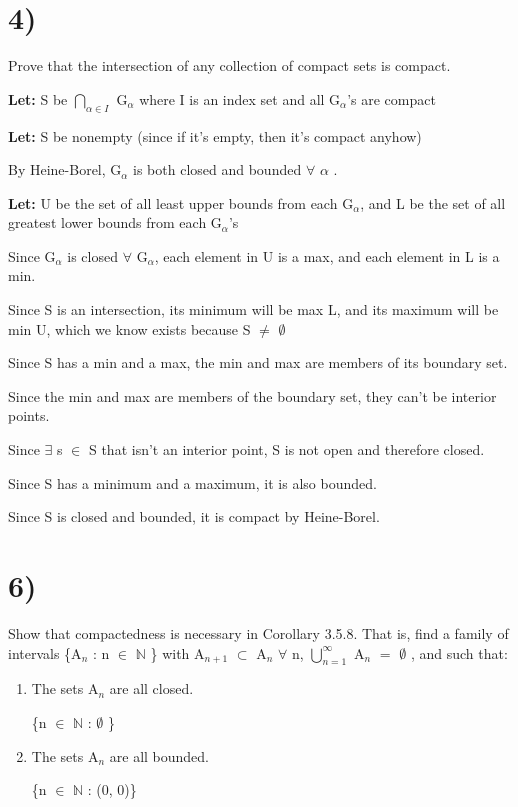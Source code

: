 \documentclass{article}
\newcommand{\mt}[1]{\ensuremath{#1}}
\newcommand\bsc[2][\DefaultOpt]{%
  \def\DefaultOpt{#2}%
  \section[#1]{#2}%
}
\newcommand{\balist}{\begin{enumerate}[label=\alph*.]}
\newcommand{\elist}{\end{enumerate}}
\newcommand{\lt}[1]{\textbf{Let: } #1}
\newcommand{\bn}{\mt{\mathbb{N}} }       %
\newcommand{\fa}{\mt{\forall} }          %
\newcommand{\afa}{\mt{\alpha} }
\newcommand{\mem}{\mt{\in} }
\newcommand{\exs}{\mt{\exists} }
\newcommand{\es}{\mt{\emptyset} }        %
\newcommand{\sbs}{\mt{\subset} }         %
\newcommand{\eql}{\mt{=} }
\newcommand{\uw}[2]{#1\mt{_{#2}}}
\newcommand{\urng}[2]{\mt{\bigcup_{#1}^{#2}}}
\newcommand{\nrng}[2]{\mt{\bigcap_{#1}^{#2}}}
\begin{document}
\bsc{4)}{
Prove that the intersection of any collection of compact sets is compact.

\lt{S be \nrng{\afa \mem I}{} \uw{G}{\afa} where I is an index set and all \uw{G}{\afa}'s are compact}

\lt{S be nonempty (since if it's empty, then it's compact anyhow)}


By Heine-Borel, \uw{G}{\afa} is both closed and bounded \fa \afa.

\lt{U be the set of all least upper bounds from each \uw{G}{\afa}, and L be the set of all greatest lower bounds from each \uw{G}{\afa}'s}

Since \uw{G}{\afa} is closed \fa \uw{G}{\afa}, each element in U is a max, and each element in L is a min.

Since S is an intersection, its minimum will be max L, and its maximum will be min U, which we know exists because S $\neq$ \es

Since S has a min and a max, the min and max are members of its boundary set.

Since the min and max are members of the boundary set, they can't be interior points.

Since \exs s \mem S that isn't an interior point, S is not open and therefore closed.

Since S has a minimum and a maximum, it is also bounded.

Since S is closed and bounded, it is compact by Heine-Borel.
}

\bsc{6)}{
Show that compactedness is necessary in Corollary 3.5.8. That is, find a family of intervals \{\uw{A}{n} : n \mem \bn\} with \uw{A}{n + 1} \sbs \uw{A}{n} \fa n, \urng{n = 1}{\infty} \uw{A}{n} \eql \es, and such that:

\balist
\item The sets \uw{A}{n} are all closed. 
	
	\{n \mem \bn : \es\}
\item The sets \uw{A}{n} are all bounded.
	
	\{n \mem \bn : (0, 0)\}
\elist

}
\end{document}
